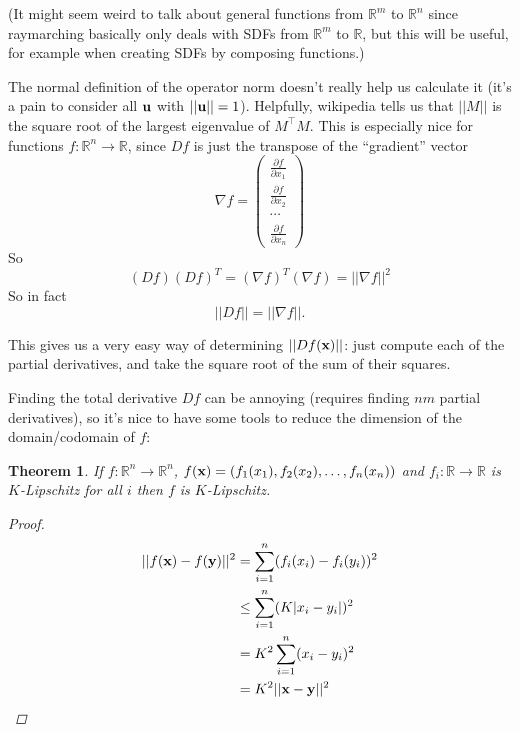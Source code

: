 \documentclass{article}
\newcommand\bb\mathbb
\renewcommand\vec\textbf
\newtheorem{theorem}{Theorem}
\newcommand\pp[2]{\frac{\partial #1}{\partial #2}}
\newcommand\transpose{^\top}
\begin{document}
(It might seem weird to talk about general functions from $\bb R^m$ to $\bb R^n$ since
raymarching basically only deals with SDFs from $\bb R^m$ to $\bb R$, but this will be useful,
for example when creating SDFs by composing functions.)

The normal definition of the operator norm doesn't really help us calculate it (it's a pain
to consider all $\vec u$ with $||\vec u|| = 1$). Helpfully, wikipedia tells us that
$||M||$ is the square root of the largest eigenvalue of $M\transpose M$.
This is especially nice for functions $f:\bb R^n\to \bb R$, since $Df$ is just the transpose of the ``gradient''
vector
$$\nabla f = \begin{pmatrix}
\pp f{x_1}\\ \pp f{x_2}\\\cdots\\\pp f{x_n}
\end{pmatrix}$$
So
$$(Df)(Df)^T = (\nabla f)^T(\nabla f) = ||\nabla f||^2$$
So in fact
$$||Df|| = ||\nabla f||.$$

This gives us a very easy way of determining $||Df(\vec x)||$: just compute each of the
partial derivatives, and take the square root of the sum of their squares.

Finding the total derivative $Df$ can be annoying (requires finding $nm$ partial derivatives),
so it's nice to have some tools to reduce the dimension of the domain/codomain of $f$:
\begin{theorem}
\label{component-wise}
If $f:\bb R^n\to\bb R^n$, $f(\vec x) = (f_1(x_1) , f_2(x_2), \dots, f_n(x_n))$
and $f_i:\bb R\to\bb R$ is $K$-Lipschitz for all $i$ then $f$ is $K$-Lipschitz.
\begin{proof}
\begin{align*}
||f(\vec x) - f(\vec y)||^2 &= \sum_{i=1}^n (f_i(x_i) - f_i(y_i))^2\\
&\leq \sum_{i=1}^n (K|x_i - y_i|)^2\\
&= K^2\sum_{i=1}^n (x_i - y_i)^2\\
&= K^2||\vec x - \vec y||^2
\end{align*}
\end{proof}
\end{theorem}
\end{document}
